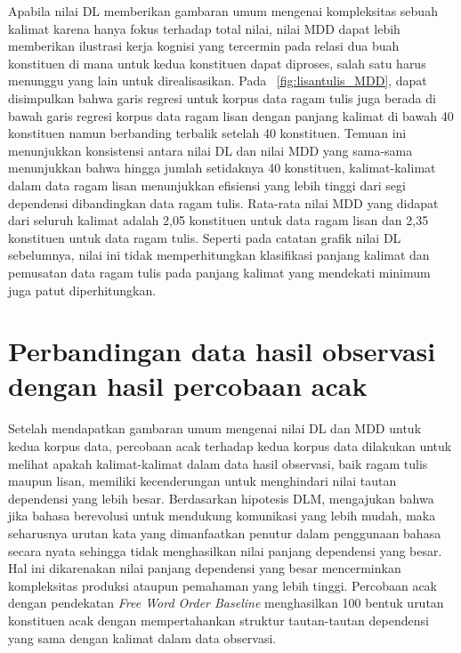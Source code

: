 Apabila nilai DL memberikan gambaran umum mengenai kompleksitas sebuah kalimat karena hanya fokus terhadap total nilai, nilai MDD dapat lebih memberikan ilustrasi kerja kognisi yang tercermin pada relasi dua buah konstituen di mana untuk kedua konstituen dapat diproses, salah satu harus menunggu yang lain untuk direalisasikan. Pada \pic~\ref{fig:lisantulis_MDD}, dapat disimpulkan bahwa garis regresi untuk korpus data ragam tulis juga berada di bawah garis regresi korpus data ragam lisan dengan panjang kalimat di bawah 40 konstituen namun berbanding terbalik setelah 40 konstituen. Temuan ini menunjukkan konsistensi antara nilai DL dan nilai MDD yang sama-sama menunjukkan bahwa hingga jumlah setidaknya 40 konstituen, kalimat-kalimat dalam data ragam lisan menunjukkan efisiensi yang lebih tinggi dari segi dependensi dibandingkan data ragam tulis. Rata-rata nilai MDD yang didapat dari seluruh kalimat adalah 2,05 konstituen untuk data ragam lisan dan 2,35 konstituen untuk data ragam tulis. Seperti pada catatan grafik nilai DL sebelumnya, nilai ini tidak memperhitungkan klasifikasi panjang kalimat dan pemusatan data ragam tulis pada panjang kalimat yang mendekati minimum juga patut diperhitungkan.

\section{Perbandingan data hasil observasi dengan hasil percobaan acak}
Setelah mendapatkan gambaran umum mengenai nilai DL dan MDD untuk kedua korpus data, percobaan acak terhadap kedua korpus data dilakukan untuk melihat apakah kalimat-kalimat dalam data hasil observasi, baik ragam tulis maupun lisan, memiliki kecenderungan untuk menghindari nilai tautan dependensi yang lebih besar. Berdasarkan hipotesis DLM, \cite{futrell2015large} mengajukan bahwa jika bahasa berevolusi untuk mendukung komunikasi yang lebih mudah, maka seharusnya urutan kata yang dimanfaatkan penutur dalam penggunaan bahasa secara nyata sehingga tidak menghasilkan nilai panjang dependensi yang besar. Hal ini dikarenakan nilai panjang dependensi yang besar mencerminkan kompleksitas produksi ataupun pemahaman yang lebih tinggi. Percobaan acak dengan pendekatan \textit{Free Word Order Baseline} menghasilkan 100 bentuk urutan konstituen acak dengan mempertahankan struktur tautan-tautan dependensi yang sama dengan kalimat dalam data observasi. 


